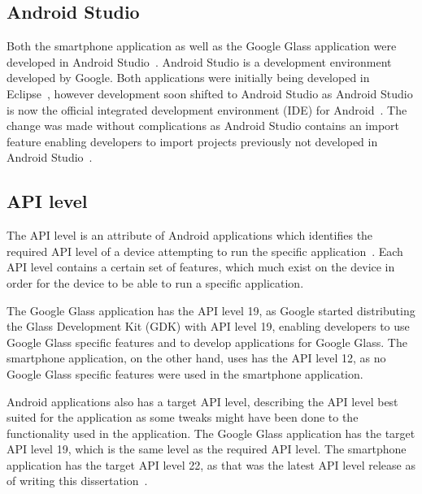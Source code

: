 

\subsection{Android Studio}
Both the smartphone application as well as the Google Glass application were developed in Android Studio~\cite{androidStudio}. Android Studio is a development environment developed by Google. Both applications were initially being developed in Eclipse~\cite{eclipse}, however development soon shifted to Android Studio as Android Studio is now the official integrated development environment (IDE) for Android~\cite{androidIDE}. The change was made without complications as Android Studio contains an import feature enabling developers to import projects previously not developed in Android Studio~\cite{androidIDE}.

\subsection{API level}
The API level is an attribute of Android applications which identifies the required API level of a device attempting to run the specific application~\cite{androidAPI}. Each API level contains a certain set of features, which much exist on the device in order for the device to be able to run a specific application.

The Google Glass application has the API level 19, as Google started distributing the Glass Development Kit (GDK) with API level 19, enabling developers to use Google Glass specific features and to develop applications for Google Glass. The smartphone application, on the other hand, uses has the API level 12, as no Google Glass specific features were used in the smartphone application.

Android applications also has a target API level, describing the API level best suited for the application as some tweaks might have been done to the functionality used in the application. The Google Glass application has the target API level 19, which is the same level as the required API level. The smartphone application has the target API level 22, as that was the latest API level release as of writing this dissertation~\cite{api22}.



